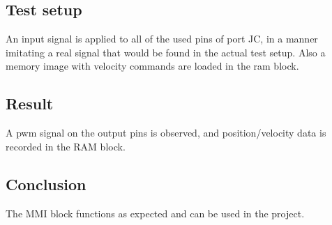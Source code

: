 \subsection{Test setup}
An input signal is applied to all of the used pins of port JC, in a manner imitating a real signal that would be found in the actual test setup. Also a memory image with velocity commands are loaded in the ram block.

\subsection{Result}
A pwm signal on the output pins is observed, and position/velocity data is recorded in the RAM block.
\subsection{Conclusion}
The MMI block functions as expected and can be used in the project.
